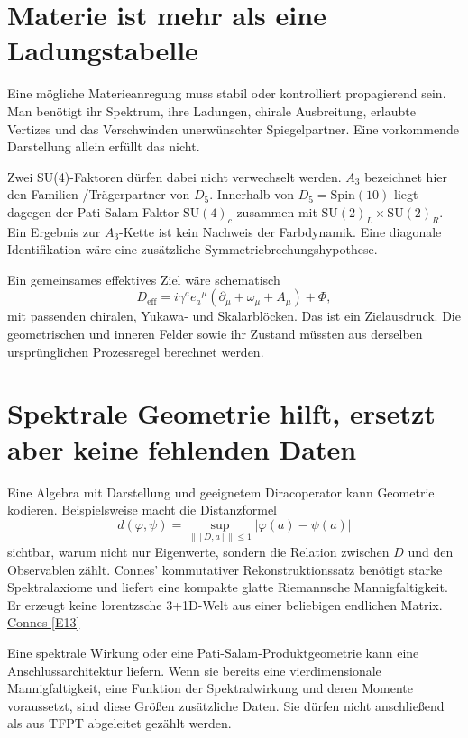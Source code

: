 \section{Materie ist mehr als eine Ladungstabelle}
Eine mögliche Materieanregung muss stabil oder kontrolliert propagierend sein. Man benötigt ihr Spektrum, ihre Ladungen, chirale Ausbreitung, erlaubte Vertizes und das Verschwinden unerwünschter Spiegelpartner. Eine vorkommende Darstellung allein erfüllt das nicht.

Zwei SU(4)-Faktoren dürfen dabei nicht verwechselt werden. $A_3$ bezeichnet hier den Familien-/Trägerpartner von $D_5$. Innerhalb von $D_5=\mathrm{Spin}(10)$ liegt dagegen der Pati-Salam-Faktor $\mathrm{SU}(4)_c$ zusammen mit $\mathrm{SU}(2)_L\times\mathrm{SU}(2)_R$. Ein Ergebnis zur $A_3$-Kette ist kein Nachweis der Farbdynamik. Eine diagonale Identifikation wäre eine zusätzliche Symmetriebrechungshypothese.

Ein gemeinsames effektives Ziel wäre schematisch
\begin{equation}
D_{\mathrm{eff}}=i\gamma^ae_a{}^\mu(\partial_\mu+\omega_\mu+A_\mu)+\Phi,
\end{equation}
mit passenden chiralen, Yukawa- und Skalarblöcken. Das ist ein Zielausdruck. Die geometrischen und inneren Felder sowie ihr Zustand müssten aus derselben ursprünglichen Prozessregel berechnet werden.

\section{Spektrale Geometrie hilft, ersetzt aber keine fehlenden Daten}
Eine Algebra mit Darstellung und geeignetem Diracoperator kann Geometrie kodieren. Beispielsweise macht die Distanzformel
\begin{equation}
d(\varphi,\psi)=\sup_{\|[D,a]\|\le1}|\varphi(a)-\psi(a)|
\end{equation}
sichtbar, warum nicht nur Eigenwerte, sondern die Relation zwischen $D$ und den Observablen zählt. Connes' kommutativer Rekonstruktionssatz benötigt starke Spektralaxiome und liefert eine kompakte glatte Riemannsche Mannigfaltigkeit. Er erzeugt keine lorentzsche 3+1D-Welt aus einer beliebigen endlichen Matrix. \href{https://arxiv.org/abs/0810.2088}{Connes [E13]}

Eine spektrale Wirkung oder eine Pati-Salam-Produktgeometrie kann eine Anschlussarchitektur liefern. Wenn sie bereits eine vierdimensionale Mannigfaltigkeit, eine Funktion der Spektralwirkung und deren Momente voraussetzt, sind diese Größen zusätzliche Daten. Sie dürfen nicht anschließend als aus TFPT abgeleitet gezählt werden.


